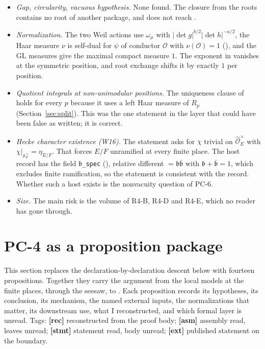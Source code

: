 \documentclass[11pt]{article}
\newcommand{\GL}{\mathrm{GL}}
\begin{document}
\begin{itemize}[leftmargin=*,itemsep=2pt]
\item \emph{Gap, circularity, vacuous hypothesis.} None found. The closure from the roots contains no root of another package, and  does not reach .
\item \emph{Normalization.} The two Weil actions use $\omega_\mu$ with $\lvert\det g\rvert^{b/2}\lvert\det h\rvert^{-a/2}$, the Haar measure $\nu$ is self-dual for $\psi$ of conductor $\mathcal O$ with $\nu(\mathcal O)=1$ (), and the $\GL$ measures give the maximal compact measure $1$. The exponent in  vanishes at the symmetric position, and root exchange shifts it by exactly $1$ per position.
\item \emph{Quotient integrals at non-unimodular positions.} The uniqueness clause of  holds for every $p$ because it uses a left Haar measure of $R_p$ (Section~\ref{sec:split}). This was the one statement in the layer that could have been false as written; it is correct.
\item \emph{Hecke character existence (W16).} The statement asks for $\chi$ trivial on $\widehat{\mathcal O}_E^\times$ with $\chi|_{\mathbb A_F^\times}=\eta_{E/F}$. That forces $E/F$ unramified at every finite place. The host record has the field \texttt{$\mathfrak b$\_spec} (), relative different $=\mathfrak b\bar{\mathfrak b}$ with $\mathfrak b+\bar{\mathfrak b}=1$, which excludes finite ramification, so the statement is consistent with the record. Whether such a host exists is the nonvacuity question of PC-6.
\item \emph{Size.} The main risk is the volume of R4-B, R4-D and R4-E, which no reader has gone through.
\end{itemize}

\section{PC-4 as a proposition package}\label{sec:pkg}

This section replaces the declaration-by-declaration descent below  with fourteen propositions. Together they carry the argument from the local models at the finite places, through the seesaw, to . Each proposition records its hypotheses, its conclusion, its mechanism, the named external inputs, the normalizations that matter, its downstream use, what I reconstructed, and which formal layer is unread. Tags: \textbf{[rec]} reconstructed from the proof body; \textbf{[asm]} assembly read, leaves unread; \textbf{[stmt]} statement read, body unread; \textbf{[ext]} published statement on the boundary.
\end{document}
